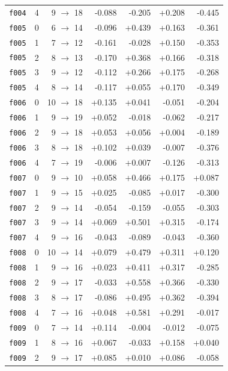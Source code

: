 \documentclass[11pt]{article}
\begin{document}
\begin{table}[htbp]
\begin{tabular}{llrrrrr}
\texttt{f004} & 4 & 9 $\to$ 18 & -0.088 & -0.205 & +0.208 & -0.445 \\
\texttt{f005} & 0 & 6 $\to$ 14 & -0.096 & +0.439 & +0.163 & -0.361 \\
\texttt{f005} & 1 & 7 $\to$ 12 & -0.161 & -0.028 & +0.150 & -0.353 \\
\texttt{f005} & 2 & 8 $\to$ 13 & -0.170 & +0.368 & +0.166 & -0.318 \\
\texttt{f005} & 3 & 9 $\to$ 12 & -0.112 & +0.266 & +0.175 & -0.268 \\
\texttt{f005} & 4 & 8 $\to$ 14 & -0.117 & +0.055 & +0.170 & -0.349 \\
\texttt{f006} & 0 & 10 $\to$ 18 & +0.135 & +0.041 & -0.051 & -0.204 \\
\texttt{f006} & 1 & 9 $\to$ 19 & +0.052 & -0.018 & -0.062 & -0.217 \\
\texttt{f006} & 2 & 9 $\to$ 18 & +0.053 & +0.056 & +0.004 & -0.189 \\
\texttt{f006} & 3 & 8 $\to$ 18 & +0.102 & +0.039 & -0.007 & -0.376 \\
\texttt{f006} & 4 & 7 $\to$ 19 & -0.006 & +0.007 & -0.126 & -0.313 \\
\texttt{f007} & 0 & 9 $\to$ 10 & +0.058 & +0.466 & +0.175 & +0.087 \\
\texttt{f007} & 1 & 9 $\to$ 15 & +0.025 & -0.085 & +0.017 & -0.300 \\
\texttt{f007} & 2 & 9 $\to$ 14 & -0.054 & -0.159 & -0.055 & -0.303 \\
\texttt{f007} & 3 & 9 $\to$ 14 & +0.069 & +0.501 & +0.315 & -0.174 \\
\texttt{f007} & 4 & 9 $\to$ 16 & -0.043 & -0.089 & -0.043 & -0.360 \\
\texttt{f008} & 0 & 10 $\to$ 14 & +0.079 & +0.479 & +0.311 & +0.120 \\
\texttt{f008} & 1 & 9 $\to$ 16 & +0.023 & +0.411 & +0.317 & -0.285 \\
\texttt{f008} & 2 & 9 $\to$ 17 & -0.033 & +0.558 & +0.366 & -0.330 \\
\texttt{f008} & 3 & 8 $\to$ 17 & -0.086 & +0.495 & +0.362 & -0.394 \\
\texttt{f008} & 4 & 7 $\to$ 16 & +0.048 & +0.581 & +0.291 & -0.017 \\
\texttt{f009} & 0 & 7 $\to$ 14 & +0.114 & -0.004 & -0.012 & -0.075 \\
\texttt{f009} & 1 & 8 $\to$ 16 & +0.067 & -0.033 & +0.158 & +0.040 \\
\texttt{f009} & 2 & 9 $\to$ 17 & +0.085 & +0.010 & +0.086 & -0.058 \\

\end{tabular}
\end{table}
\end{document}
